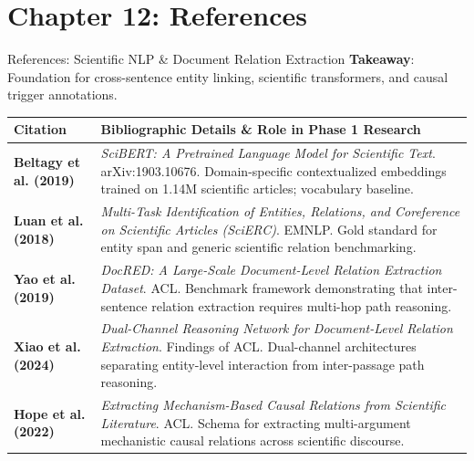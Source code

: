 \documentclass[aspectratio=43,10pt]{beamer}
\begin{document}
\section{Chapter 12: References}

\begin{frame}{References: Scientific NLP \& Document Relation Extraction}
  \vspace{-0.08cm}
  \textbf{Takeaway}: Foundation for cross-sentence entity linking, scientific transformers, and causal trigger annotations.
  \vspace{0.05cm}
  \begin{center}
    \fontsize{5.1pt}{6.3pt}\selectfont
    \begin{tabularx}{\linewidth}{p{2.2cm}>{\raggedright\arraybackslash}X}
      \toprule
      \textbf{\color{navy}Citation} & \textbf{\color{navy}Bibliographic Details \& Role in Phase 1 Research} \\
      \midrule
      \textbf{Beltagy et al. (2019)} & \textit{SciBERT: A Pretrained Language Model for Scientific Text}. arXiv:1903.10676. Domain-specific contextualized embeddings trained on 1.14M scientific articles; vocabulary baseline. \\
      \addlinespace[1.5pt]
      \textbf{Luan et al. (2018)} & \textit{Multi-Task Identification of Entities, Relations, and Coreference on Scientific Articles (SciERC)}. EMNLP. Gold standard for entity span and generic scientific relation benchmarking. \\
      \addlinespace[1.5pt]
      \textbf{Yao et al. (2019)} & \textit{DocRED: A Large-Scale Document-Level Relation Extraction Dataset}. ACL. Benchmark framework demonstrating that inter-sentence relation extraction requires multi-hop path reasoning. \\
      \addlinespace[1.5pt]
      \textbf{Xiao et al. (2024)} & \textit{Dual-Channel Reasoning Network for Document-Level Relation Extraction}. Findings of ACL. Dual-channel architectures separating entity-level interaction from inter-passage path reasoning. \\
      \addlinespace[1.5pt]
      \textbf{Hope et al. (2022)} & \textit{Extracting Mechanism-Based Causal Relations from Scientific Literature}. ACL. Schema for extracting multi-argument mechanistic causal relations across scientific discourse. \\

\end{tabularx}
\end{center}
\end{frame}
\end{document}
